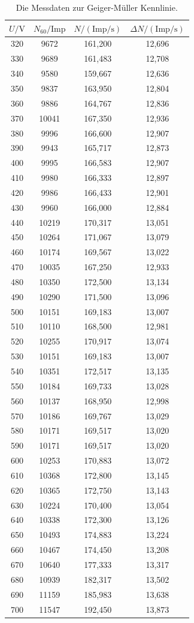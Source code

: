  \begin{table}[H]
  \centering
  \caption{Die Messdaten zur Geiger-Müller Kennlinie.}
  \label{tab:Kennlinie}
  \begin{tabular}{| c | c |c|c| }
  \toprule
  $U/\mathrm{V}$ & $N_{60}/\mathrm{Imp}$ & $N/\mathrm{(Imp/s)}$&$\Delta N/\mathrm{(Imp/s)}$ \\
  \midrule
  320	&9672	&161,200	& 12,696\\
330	&9689	&161,483	& 12,708\\
340	&9580	&159,667	& 12,636\\
350	&9837	&163,950	& 12,804\\
360	&9886	&164,767	& 12,836\\
370	&10041&167,350	& 12,936\\
380	&9996	&166,600	& 12,907\\
390	&9943	&165,717	& 12,873\\
400	&9995	&166,583	& 12,907\\
410	&9980	&166,333	& 12,897\\
420	&9986	&166,433	& 12,901\\
430	&9960	&166,000	& 12,884\\
440	&10219	&170,317	& 13,051\\
450	&10264	&171,067	& 13,079\\
460	&10174	&169,567	& 13,022\\
470	&10035	&167,250	& 12,933\\
480	&10350	&172,500	& 13,134\\
490	&10290	&171,500	& 13,096\\
500	&10151	&169,183	& 13,007\\
510	&10110	&168,500	& 12,981\\
520	&10255	&170,917	& 13,074\\
530	&10151	&169,183	& 13,007\\
540	&10351	&172,517	& 13,135\\
550	&10184	&169,733	& 13,028\\
560	&10137	&168,950	& 12,998\\
570	&10186	&169,767	& 13,029\\
580	&10171	&169,517	& 13,020\\
590	&10171	&169,517	& 13,020\\
600	&10253	&170,883	& 13,072\\
610	&10368	&172,800	& 13,145\\
620	&10365	&172,750	& 13,143\\
630	&10224	&170,400	& 13,054\\
640	&10338	&172,300	& 13,126\\
650	&10493	&174,883	& 13,224\\
660	&10467	&174,450	& 13,208\\
670	&10640	&177,333	& 13,317\\
680	&10939	&182,317	& 13,502\\
690	&11159	&185,983	& 13,638\\
700	&11547	&192,450	& 13,873\\
  \bottomrule
  \end{tabular}
\end{table}
